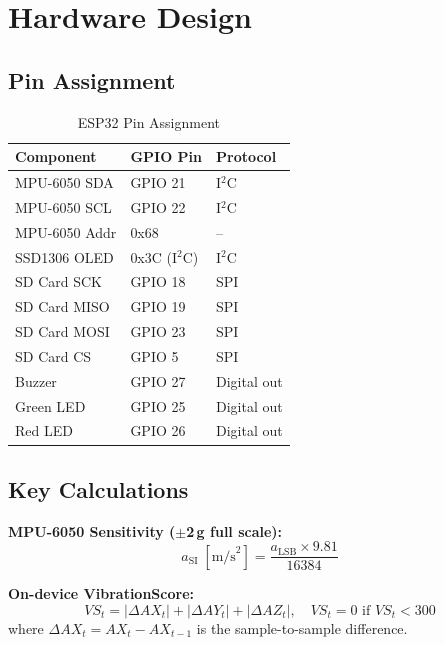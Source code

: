 \documentclass[12pt,a4paper]{report}
\begin{document}
\section{Hardware Design}

\subsection{Pin Assignment}

\begin{table}[H]
  \centering
  \caption{ESP32 Pin Assignment}
  \label{tab:pins}
  \begin{tabular}{lll}
    \toprule
    \textbf{Component} & \textbf{GPIO Pin} & \textbf{Protocol} \\
    \midrule
    MPU-6050 SDA  & GPIO 21 & I$^2$C \\
    MPU-6050 SCL  & GPIO 22 & I$^2$C \\
    MPU-6050 Addr & 0x68    & -- \\
    SSD1306 OLED  & 0x3C (I$^2$C) & I$^2$C \\
    SD Card SCK   & GPIO 18 & SPI \\
    SD Card MISO  & GPIO 19 & SPI \\
    SD Card MOSI  & GPIO 23 & SPI \\
    SD Card CS    & GPIO 5  & SPI \\
    Buzzer        & GPIO 27 & Digital out \\
    Green LED     & GPIO 25 & Digital out \\
    Red LED       & GPIO 26 & Digital out \\
    \bottomrule
  \end{tabular}
\end{table}

\subsection{Key Calculations}

\textbf{MPU-6050 Sensitivity ($\pm$2\,g full scale):}
\begin{equation}
  a_{\text{SI}} \;[\text{m/s}^2] = \frac{a_{\text{LSB}} \times 9.81}{16384}
  \label{eq:lsb}
\end{equation}

\textbf{On-device VibrationScore:}
\begin{equation}
  VS_t = |\Delta AX_t| + |\Delta AY_t| + |\Delta AZ_t|, \quad
  VS_t = 0 \text{ if } VS_t < 300
  \label{eq:vs}
\end{equation}
where $\Delta AX_t = AX_t - AX_{t-1}$ is the sample-to-sample difference.
\end{document}
